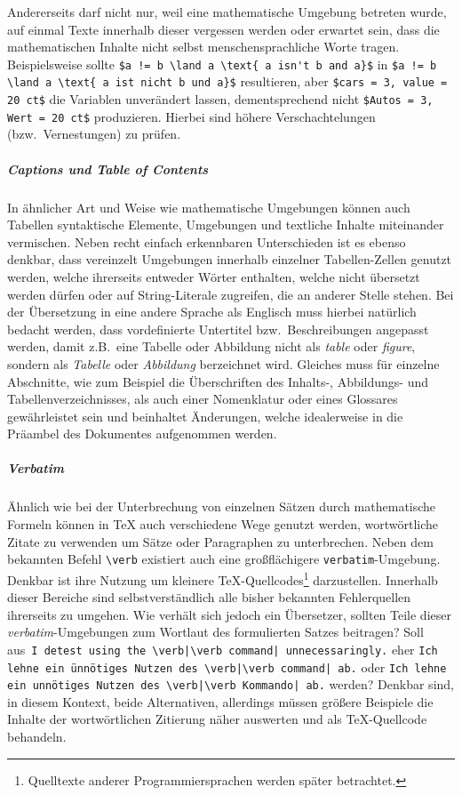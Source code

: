 Andererseits darf nicht nur, weil eine mathematische Umgebung betreten wurde, auf einmal Texte innerhalb dieser vergessen werden oder erwartet sein, dass die mathematischen Inhalte nicht selbst menschensprachliche Worte tragen. Beispielsweise sollte \verb|$a != b \land a \text{ a isn't b and a}$| in \verb|$a != b \land a \text{ a ist nicht b und a}$| resultieren, aber \verb|$cars = 3, value = 20 ct$| die Variablen unverändert lassen, dementsprechend nicht \verb|$Autos = 3, Wert = 20 ct$| produzieren.
Hierbei sind höhere Verschachtelungen (bzw.\ Vernestungen) zu prüfen. 

\subparagraph*{Captions und Table of Contents}\par
In ähnlicher Art und Weise wie mathematische Umgebungen können auch Tabellen syntaktische Elemente, Umgebungen und textliche Inhalte miteinander vermischen.%
Neben recht einfach erkennbaren Unterschieden ist es ebenso denkbar, dass vereinzelt Umgebungen innerhalb einzelner Tabellen-Zellen genutzt werden, welche ihrerseits entweder Wörter enthalten, welche nicht übersetzt werden dürfen oder auf String-Literale zugreifen, die an anderer Stelle stehen. Bei der Übersetzung in eine andere Sprache als Englisch muss hierbei natürlich bedacht werden, dass vordefinierte Untertitel bzw.\ Beschreibungen angepasst werden, damit z.B.\ eine Tabelle oder Abbildung nicht als \textit{table} oder \textit{figure}, sondern als \textit{Tabelle} oder \textit{Abbildung} berzeichnet wird. Gleiches muss für einzelne Abschnitte, wie zum Beispiel die Überschriften des Inhalts-, Abbildungs- und Tabellenverzeichnisses, als auch einer Nomenklatur oder eines Glossares gewährleistet sein und beinhaltet Änderungen, welche idealerweise in die Präambel des Dokumentes aufgenommen werden.

\subparagraph*{Verbatim}\par
Ähnlich wie bei der Unterbrechung von einzelnen Sätzen durch mathematische Formeln können in \TeX{} auch verschiedene Wege genutzt werden, wortwörtliche Zitate zu verwenden um Sätze oder Paragraphen zu unterbrechen. Neben dem bekannten Befehl \verb-\verb- existiert auch eine großflächigere \texttt{verbatim}-Umgebung. Denkbar ist ihre Nutzung um kleinere \TeX{}-Quellcodes\footnote{Quelltexte anderer Programmiersprachen werden später betrachtet.} darzustellen. Innerhalb dieser Bereiche sind selbstverständlich alle bisher bekannten Fehlerquellen ihrerseits zu umgehen. Wie verhält sich jedoch ein Übersetzer, sollten Teile dieser \textit{verbatim}-Umgebungen zum Wortlaut des formulierten Satzes beitragen? Soll aus\ \verb"I detest using the \verb|\verb command| unnecessaringly." eher \verb"Ich lehne ein ünnötiges Nutzen des \verb|\verb command| ab." oder \verb"Ich lehne ein unnötiges Nutzen des \verb|\verb Kommando| ab." werden? Denkbar sind, in diesem Kontext, beide Alternativen, allerdings müssen größere Beispiele die Inhalte der wortwörtlichen Zitierung näher auswerten und als \TeX{}-Quellcode behandeln.


